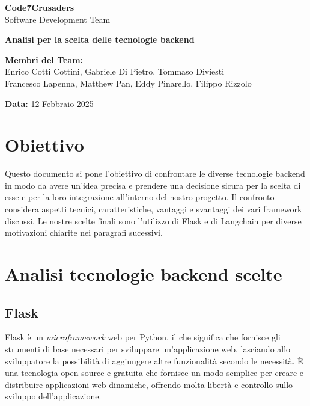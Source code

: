 \documentclass{article}
\begin{document}
\begin{titlepage}
    {\Huge \textbf{Code7Crusaders}}\\
    \vspace{0.5cm}
    {\Large Software Development Team}\\
    \vspace{2cm}
    
    {\large \textbf{Analisi per la scelta delle tecnologie backend}}\\
    \vspace{5cm}

    \textbf{Membri del Team:}\\
    Enrico Cotti Cottini, Gabriele Di Pietro, Tommaso Diviesti \\
    Francesco Lapenna, Matthew Pan, Eddy Pinarello, Filippo Rizzolo \\
    \vspace{0.5cm}
    
    {\large \textbf{Data:}} 12 Febbraio 2025\\
    
    \vspace{1cm}
\end{titlepage}
\clearpage

\newpage
\tableofcontents
\newpage

\section{Obiettivo}
Questo documento si pone l'obiettivo di confrontare le diverse 
tecnologie backend in modo da avere un'idea precisa e prendere 
una decisione sicura per la scelta di esse e per la loro integrazione 
all'interno del nostro progetto. Il confronto considera aspetti 
tecnici, caratteristiche, vantaggi e svantaggi dei vari framework 
discussi. Le nostre scelte finali sono l'utilizzo di Flask e di 
Langchain per diverse motivazioni chiarite nei paragrafi sucessivi.

\section{Analisi tecnologie backend scelte}

\subsection{Flask}
Flask è un \textit{microframework} web per Python, il che significa 
che fornisce gli strumenti di base necessari per sviluppare 
un'applicazione web, lasciando allo sviluppatore la possibilità di 
aggiungere altre funzionalità secondo le necessità. È una tecnologia 
open source e gratuita che fornisce un modo semplice per creare e 
distribuire applicazioni web dinamiche, offrendo molta libertà e 
controllo sullo sviluppo dell’applicazione.
\end{document}
